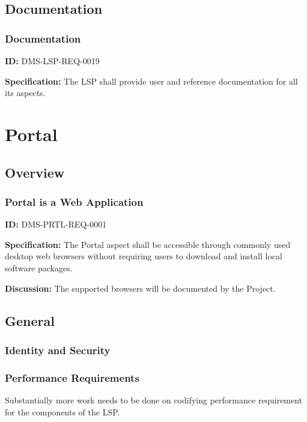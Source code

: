 \documentclass[SE,toc,lsstdraft]{lsstdoc}
\begin{document}
\subsection{Documentation}

\subsubsection{Documentation}

\label{DMS-LSP-REQ-0019}
\textbf{ID:} DMS-LSP-REQ-0019

\textbf{Specification:}
The LSP shall provide user and reference documentation for all its aspects.

\section{Portal}

\subsection{Overview}

\subsubsection{Portal is a Web Application}

\label{DMS-PRTL-REQ-0001}
\textbf{ID:} DMS-PRTL-REQ-0001

\textbf{Specification:}
The Portal aspect shall be accessible through commonly used desktop web browsers without requiring users to download and install local software packages.

\textbf{Discussion:}
The supported browsers will be documented by the Project.

\subsection{General}

\subsubsection{Identity and Security}

\subsubsection{Performance Requirements}

Substantially more work needs to be done on codifying performance requirement for the components of the LSP.
\end{document}
